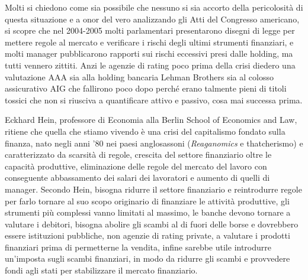 \documentclass[11pt]{article}
\begin{document}
Molti si chiedono come sia possibile che nessuno si sia accorto della pericolosit\`a
di questa situazione e a onor del vero analizzando gli 
Atti del Congresso americano, si scopre che nel 2004-2005 molti parlamentari  presentarono
disegni di legge per mettere regole al mercato e verificare i rischi degli ultimi strumenti finanziari,
e molti manager pubblicarono rapporti sui rischi eccessivi presi dalle holding, ma tutti vennero
zittiti. Anzi le agenzie di rating poco prima della crisi diedero una valutazione AAA sia alla holding
bancaria Lehman Brothers sia al colosso assicurativo AIG che fallirono poco dopo
perch\'e erano talmente pieni di titoli tossici che non si riusciva a quantificare attivo e passivo, cosa mai
successa prima.

Eckhard Hein, professore di Economia alla Berlin School of Economics and Law, 
ritiene che quella che stiamo vivendo \`e una crisi del capitalismo fondato sulla finanza, nato negli anni '80
nei paesi anglosassoni (\emph{Reaganomics} e thatcherismo) e caratterizzato da scarsit\`a di regole, 
crescita del settore finanziario
oltre le capacit\`a produttive, eliminazione delle regole del mercato del lavoro 
con conseguente abbassamento dei salari dei
lavoratori e aumento di quelli di manager.
Secondo Hein, bisogna ridurre il settore finanziario e reintrodurre regole per
farlo tornare al suo scopo originario di finanziare le attivit\`a produttive, gli
strumenti pi\`u complessi vanno limitati al massimo, le banche devono
tornare a valutare i debitori, bisogna abolire gli scambi al di fuori
delle borse e dovrebbero essere istituzioni pubbliche, non agenzie di rating private, a valutare
i prodotti finanziari prima di permetterne la vendita, infine sarebbe utile introdurre un'imposta sugli scambi
finanziari, in modo da ridurre gli scambi e provvedere fondi agli stati per
stabilizzare il mercato finanziario.
\end{document}
